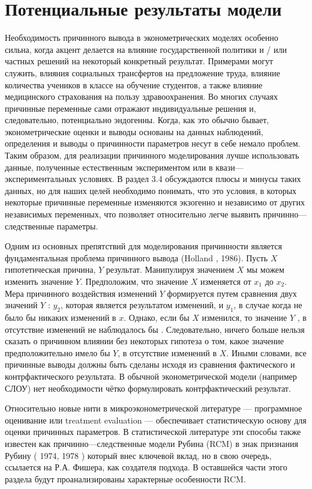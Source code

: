	
\section{Потенциальные результаты модели}


Необходимость причинного вывода в эконометрических моделях особенно сильна, когда акцент делается на влияние государственной политики и / или частных решений на некоторый конкретный результат. Примерами могут служить,  влияния социальных трансфертов на предложение труда, влияние количества учеников в классе на обучение студентов, а также влияние медицинского страхования на пользу здравоохранения. Во многих случаях причинные переменные сами отражают индивидуальные решения и, следовательно, потенциально эндогенны. Когда, как это обычно бывает, эконометрические оценки и выводы основаны на данных наблюдений, определения и выводы о причинности параметров несут в себе немало проблем. Таким образом, для реализации причинного моделирования лучше использовать данные, полученные естественным экспериментом или в квази---экспериментальных условиях. В раздел 3.4 обсуждаются плюсы и минусы таких  данных, но для наших целей необходимо понимать, что это условия, в которых некоторые причинные переменные изменяются экзогенно и независимо от других независимых переменных, что позволяет относительно легче  выявить причинно---следственные параметры.
	
	
	Одним из основных препятствий для моделирования причинности является фундаментальная проблема причинного вывода (Holland , 1986). Пусть $X$ гипотетическая причина, $Y$ результат. Манипулируя значением $X$ мы можем изменить значение $Y$. Предположим, что значение $X$ изменяется от $x_{1}$ до $x_{2}$. Мера причинного воздействия изменений $Y$ формируется путем сравнения двух значений $Y$ : $y_{2}$, которая является результатом изменений, и $y_{1}$, в случае когда не было бы никаких изменений в $x$. Однако, если бы $X$ изменился, то значение $Y$ , в отсутствие изменений не наблюдалось бы . Следовательно, ничего больше нельзя сказать о причинном влиянии без некоторых гипотеза о том, какое значение предположительно имело бы $Y$, в отсутствие изменений в $X$. Иными словами, все причинные выводы должны быть сделаны исходя из сравнения фактического и контрфактического результата. В обычной эконометрической модели (например СЛОУ) нет необходимости чётко формулировать контрфактический результат.
	
	
	Относительно новые нити в микроэконометрической литературе --- программное оценивание или treatment evaluation --- обеспечивает статистическую основу для оценки причинных параметров. В статистической литературе эти способы также известен как причинно---следственные модели Рубина (RCM) в знак признания Рубину ( 1974, 1978 ) который внес ключевой вклад, но в свою очередь, ссылается на Р.А. Фишера, как создателя подхода. В оставшейся части этого раздела будут проанализированы характерные особенности RCM. 



